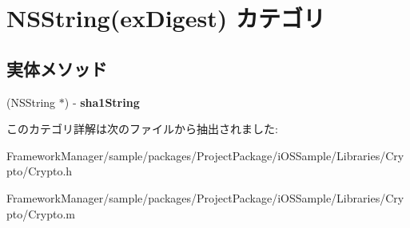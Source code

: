 \hypertarget{category_n_s_string_07ex_digest_08}{}\section{N\+S\+String(ex\+Digest) カテゴリ}
\label{category_n_s_string_07ex_digest_08}
\subsection*{実体メソッド}
\begin{DoxyCompactItemize}
\item 
\hypertarget{category_n_s_string_07ex_digest_08_aa6c26d08a01119ae8425d7598bdd93d6}{}(N\+S\+String $\ast$) -\/ {\bfseries sha1\+String}\label{category_n_s_string_07ex_digest_08_aa6c26d08a01119ae8425d7598bdd93d6}

\end{DoxyCompactItemize}


このカテゴリ詳解は次のファイルから抽出されました\+:\begin{DoxyCompactItemize}
\item 
Framework\+Manager/sample/packages/\+Project\+Package/i\+O\+S\+Sample/\+Libraries/\+Crypto/Crypto.\+h\item 
Framework\+Manager/sample/packages/\+Project\+Package/i\+O\+S\+Sample/\+Libraries/\+Crypto/Crypto.\+m\end{DoxyCompactItemize}
